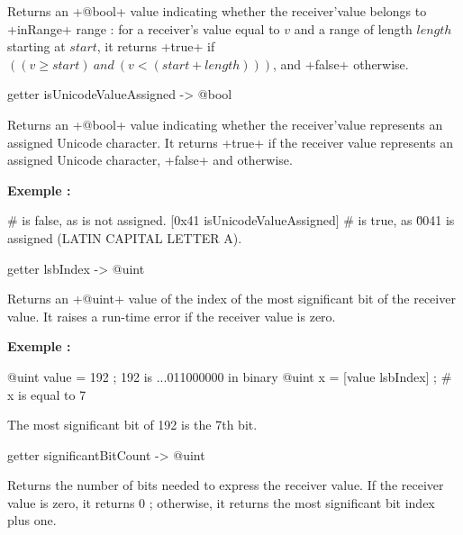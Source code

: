 {Returns an \ggs+@bool+ value indicating whether the receiver'value belongs to \ggs+inRange+ range : for a receiver's value equal to $v$ and a range of length $length$ starting at $start$, it returns \ggs+true+ if $((v \geqslant start)~and~(v<(start+length)))$, and \ggs+false+ otherwise.




\begin{galgascode}
getter isUnicodeValueAssigned -> @bool
\end{galgascode}

Returns an \ggs+@bool+ value indicating whether the receiver'value represents an assigned Unicode character. It returns \ggs+true+ if the receiver value represents an assigned Unicode character, \ggs+false+ and otherwise.

\textbf{Exemple :}
\begin{galgascode}
 # is false, as \uFFFF is not assigned.
[0x41 isUnicodeValueAssigned] # is true, as \u0041 is assigned (LATIN CAPITAL LETTER A).
\end{galgascode}




\begin{galgascode}
getter lsbIndex -> @uint
\end{galgascode}

Returns an \ggs+@uint+ value of the index of the most significant bit of the receiver value. It raises a run-time error if the receiver value is zero.

\textbf{Exemple :}
\begin{galgascode}
@uint value = 192 ; 192 is ...011000000 in binary
@uint x = [value lsbIndex] ; # x is equal to 7
\end{galgascode}

The most significant bit of 192 is the 7th bit.





\begin{galgascode}
getter significantBitCount -> @uint
\end{galgascode}

Returns the number of bits needed to express the receiver value. If the receiver value is zero, it returns 0 ; otherwise, it returns the most significant bit index plus one.

}
